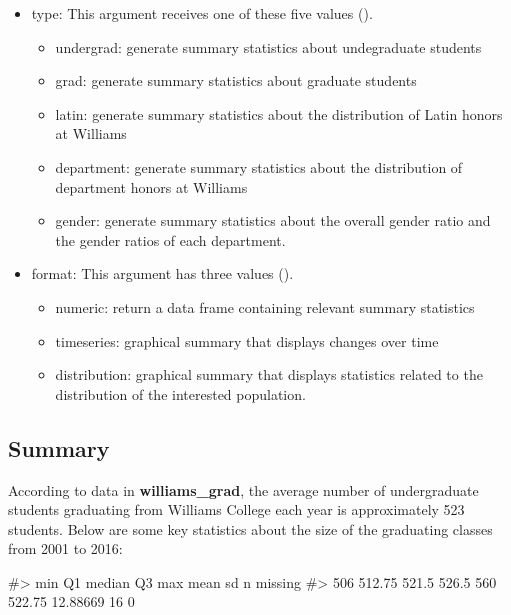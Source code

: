 \begin{itemize}
\tightlist
\item
  type: This argument receives one of these five values
  ().

  \begin{itemize}
  \tightlist
  \item
    undergrad: generate summary statistics about undegraduate students
  \item
    grad: generate summary statistics about graduate students
  \item
    latin: generate summary statistics about the distribution of Latin
    honors at Williams
  \item
    department: generate summary statistics about the distribution of
    department honors at Williams
  \item
    gender: generate summary statistics about the overall gender ratio
    and the gender ratios of each department.
  \end{itemize}
\item
  format: This argument has three values
  ().

  \begin{itemize}
  \tightlist
  \item
    numeric: return a data frame containing relevant summary statistics
  \item
    timeseries: graphical summary that displays changes over time
  \item
    distribution: graphical summary that displays statistics related to
    the distribution of the interested population.
  \end{itemize}
\end{itemize}

\subsection{Summary}\label{summary}

According to data in \textbf{williams\_grad}, the average number of
undergraduate students graduating from Williams College each year is
approximately 523 students. Below are some key statistics about the size
of the graduating classes from 2001 to 2016:

\begin{Schunk}
\begin{Soutput}
#>  min     Q1 median    Q3 max   mean       sd  n missing
#>  506 512.75  521.5 526.5 560 522.75 12.88669 16       0
\end{Soutput}
\end{Schunk}

